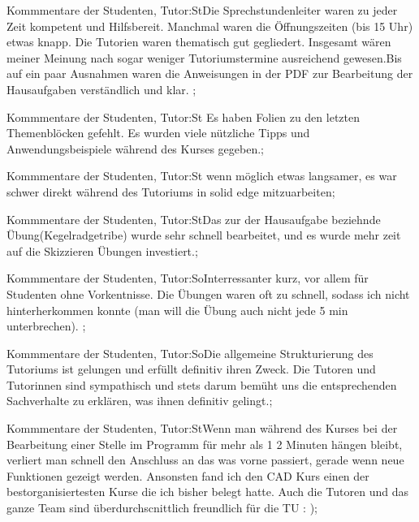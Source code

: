\documentclass[10pt]{beamer}
\begin{document}
\begin{frame}[fragile]{Kommmentare der Studenten, Tutor:St}Die Sprechstundenleiter waren zu jeder Zeit kompetent und Hilfsbereit. Manchmal waren die Öffnungszeiten (bis 15 Uhr) etwas knapp. Die Tutorien waren thematisch gut gegliedert. Insgesamt wären meiner Meinung nach sogar weniger Tutoriumstermine ausreichend gewesen.Bis auf ein paar Ausnahmen waren die Anweisungen in der PDF zur Bearbeitung der Hausaufgaben verständlich und klar.  ;
 \end{frame}
\begin{frame}[fragile]{Kommmentare der Studenten, Tutor:St}  Es haben Folien zu den letzten Themenblöcken gefehlt.   Es wurden viele nützliche Tipps und Anwendungsbeispiele während des Kurses gegeben.;
 \end{frame}
\begin{frame}[fragile]{Kommmentare der Studenten, Tutor:St} wenn möglich etwas langsamer, es war schwer direkt während des Tutoriums in solid edge mitzuarbeiten;
 \end{frame}
\begin{frame}[fragile]{Kommmentare der Studenten, Tutor:St}Das zur der Hausaufgabe beziehnde Übung(Kegelradgetribe) wurde sehr schnell bearbeitet, und es wurde mehr zeit auf die Skizzieren Übungen investiert.;
 \end{frame}
\begin{frame}[fragile]{Kommmentare der Studenten, Tutor:So}Interressanter kurz, vor allem für Studenten ohne Vorkentnisse. Die Übungen waren oft zu schnell, sodass ich nicht hinterherkommen konnte (man will die Übung auch nicht jede 5 min unterbrechen). ;
 \end{frame}
\begin{frame}[fragile]{Kommmentare der Studenten, Tutor:So}Die allgemeine Strukturierung des Tutoriums ist gelungen und erfüllt definitiv ihren Zweck. Die Tutoren und Tutorinnen sind sympathisch und stets darum bemüht uns die entsprechenden Sachverhalte zu erklären, was ihnen definitiv gelingt.;
 \end{frame}
\begin{frame}[fragile]{Kommmentare der Studenten, Tutor:St}Wenn man während des Kurses bei der Bearbeitung einer Stelle im Programm für mehr als 1 2 Minuten hängen bleibt, verliert man schnell den Anschluss an das was vorne passiert, gerade wenn neue Funktionen gezeigt werden. Ansonsten fand ich den CAD Kurs einen der bestorganisiertesten Kurse die ich bisher belegt hatte. Auch die Tutoren und das ganze Team sind überdurchscnittlich freundlich für die TU : );
 \end{frame}
\end{document}
